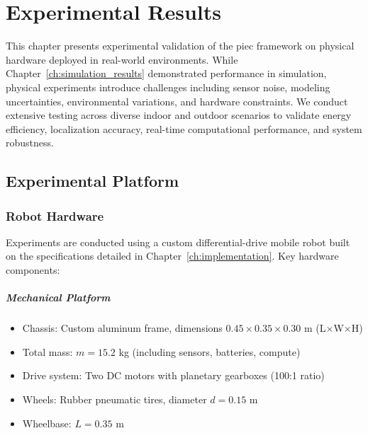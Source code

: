 \chapter{Experimental Results}
\label{ch:experimental_results}

This chapter presents experimental validation of the \acrfull{piec} framework on physical hardware deployed in real-world environments. While Chapter~\ref{ch:simulation_results} demonstrated performance in simulation, physical experiments introduce challenges including sensor noise, modeling uncertainties, environmental variations, and hardware constraints. We conduct extensive testing across diverse indoor and outdoor scenarios to validate energy efficiency, localization accuracy, real-time computational performance, and system robustness.

\section{Experimental Platform}
\label{sec:experimental_platform}

\subsection{Robot Hardware}

Experiments are conducted using a custom differential-drive mobile robot built on the specifications detailed in Chapter~\ref{ch:implementation}. Key hardware components:

\paragraph{Mechanical Platform}
\begin{itemize}
    \item Chassis: Custom aluminum frame, dimensions $0.45 \times 0.35 \times 0.30$ m (L×W×H)
    \item Total mass: $m = 15.2$ kg (including sensors, batteries, compute)
    \item Drive system: Two DC motors with planetary gearboxes (100:1 ratio)
    \item Wheels: Rubber pneumatic tires, diameter $d = 0.15$ m
    \item Wheelbase: $L = 0.35$ m
\end{itemize}

